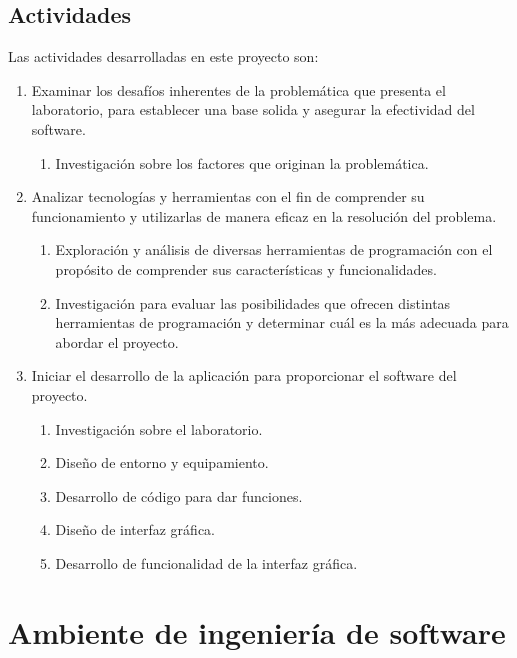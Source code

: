 \subsection{Actividades}
Las actividades desarrolladas en este proyecto son:
\begin{enumerate}[label=\roman*.-]
\item Examinar los desafíos inherentes de la problemática que presenta el laboratorio, para establecer una base solida y asegurar la efectividad del software.
    \begin{enumerate}[label=\arabic*.-]
    \item Investigación sobre los factores que originan la problemática.
    \end{enumerate}
\item Analizar tecnologías y herramientas con el fin de comprender su funcionamiento y utilizarlas de manera eficaz en la resolución del problema.
    \begin{enumerate}[label=\arabic*.-]
    \item Exploración y análisis de diversas herramientas de programación con el propósito de comprender sus características y funcionalidades.
    \item Investigación para evaluar las posibilidades que ofrecen distintas herramientas de programación y determinar cuál es la más adecuada para abordar el proyecto.
    \end{enumerate}
\item Iniciar el desarrollo de la aplicación para proporcionar el software del proyecto.
    \begin{enumerate}[label=\arabic*.-]
    \item Investigación sobre el laboratorio.
    \item Diseño de entorno y equipamiento.
    \item Desarrollo de código para dar funciones.
    \item Diseño de interfaz gráfica.
    \item Desarrollo de funcionalidad de la interfaz gráfica.
    \end{enumerate}
\end{enumerate}

\section{Ambiente de ingeniería de software}
